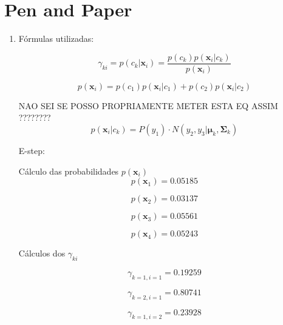 \documentclass[a4paper,12pt]{article} %
\begin{document}
\section*{Pen and Paper}
\begin{enumerate}

\item Fórmulas utilizadas:

\begin{equation}
    \gamma_{ki} = p(c_k|\mathbf{x}_i) = \frac{p(c_k)p(\mathbf{x}_i|c_k)}{p(\mathbf{x}_i)}
\end{equation}

\begin{equation}
    p(\mathbf{x}_i) = p(c_1)p(\mathbf{x}_i|c_1)+p(c_2)p(\mathbf{x}_i|c_2)
\end{equation}

NAO SEI SE POSSO PROPRIAMENTE METER ESTA EQ ASSIM ????????
\begin{equation}
    p(\mathbf{x}_i|c_k) = P(y_1) \cdot N(y_2, y_3 | \boldsymbol{\mu}_k, \boldsymbol{\Sigma}_k)
\end{equation}

E-step:

Cálculo das probabilidades $p(\textbf{x}_i)$
\begin{equation*}
    p(\textbf{x}_1) = 0.05185
\end{equation*}

\begin{equation*}
    p(\textbf{x}_2) = 0.03137
\end{equation*}

\begin{equation*}
    p(\textbf{x}_3) = 0.05561
\end{equation*}

\begin{equation*}
    p(\textbf{x}_4) = 0.05243
\end{equation*}

Cálculos dos $\gamma_{ki}$

\begin{equation*}
    \gamma_{k=1,i=1} = 0.19259
\end{equation*}

\begin{equation*}
    \gamma_{k=2,i=1} = 0.80741
\end{equation*}

\begin{equation*}
    \gamma_{k=1,i=2} = 0.23928
\end{equation*}


\end{enumerate}
\end{document}
